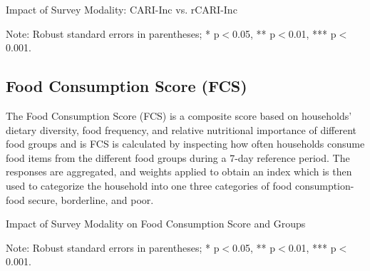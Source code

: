 \documentclass[11pt,harvard]{article}
\begin{document}
	
		
	\begin{table}[htbp]
		\centering
		\begin{adjustbox}{max width=\textwidth}
			\begin{threeparttable}
				\caption{Impact of Survey Modality: CARI-Inc vs. rCARI-Inc}
				\scriptsize
				 
				\label{tab:Inc_CARI_rCARI_Modality_CAR}
				\begin{tablenotes}
					\item Note: Robust standard errors in parentheses; * p$<$0.05, ** p$<$0.01, *** p$<$0.001. 
				\end{tablenotes}
			\end{threeparttable}
		\end{adjustbox}
	\end{table}
	
	\pagebreak
	
	
	
	
	\subsection{Food Consumption Score (FCS)}
	
	The Food Consumption Score (FCS) is a composite score based on households’ dietary diversity, food frequency, and relative nutritional importance of different food groups and is FCS is calculated by inspecting how often households consume food items from the different food groups during a 7-day reference period. The responses are aggregated, and weights applied to obtain an index which is then used to categorize the household into one three categories of food consumption-food secure, borderline, and poor.
	
	
	\begin{table}[htbp]
		\centering
		\begin{adjustbox}{max width=\textwidth}
			\begin{threeparttable}
				\caption{Impact of Survey Modality on Food Consumption Score and Groups}
				\scriptsize
				 
				\label{tab:FCS_Modality_CAR}
				\begin{tablenotes}
					\item Note: Robust standard errors in parentheses; * p$<$0.05, ** p$<$0.01, *** p$<$0.001. 
				\end{tablenotes}
			\end{threeparttable}
		\end{adjustbox}
	\end{table}
	
\end{document}
